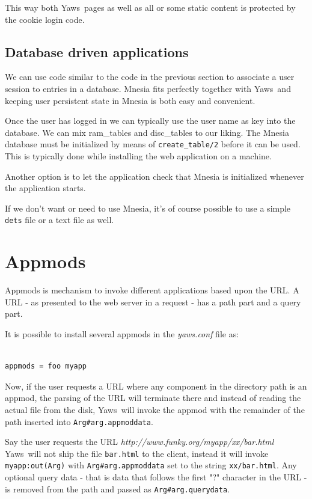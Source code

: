 \documentclass[11pt,oneside,english]{book}
\newcommand{\Yaws}            %
        {{\sc Yaws}}
\begin{document}
This way both \Yaws\  pages as well as all or some static content
is protected by the cookie login code.


\subsection{Database driven applications}

We can use code similar to the code in the previous section to associate
a user session to entries in a database. Mnesia fits perfectly
together with \Yaws\  and keeping user persistent state in Mnesia is
both easy and convenient.

Once the user has logged in we can typically use the user name
as key into the database. We can mix ram\_tables and disc\_tables
to our liking. The Mnesia database must be initialized by means
of \verb+create_table/2+ before it
can be used. This is typically done while installing the
web application on a machine.

Another option is to let the application check that Mnesia
is initialized whenever the application starts.

If we don't want or need to use Mnesia, it's of course possible
to use a simple \verb+dets+ file or a text file as well.

\section{Appmods}

Appmods is mechanism to invoke different applications
based upon the URL. A URL - as presented to the web server in
a request - has a path part and a query part.

It is possible to install several appmods in the \textit{yaws.conf}
file as:
\begin{verbatim}

appmods = foo myapp

\end{verbatim}

Now, if the user requests a URL where any component in the
directory path is an appmod, the parsing of the URL will terminate
there and instead of reading the actual file from the disk, \Yaws\  will
invoke the appmod with the remainder of the path inserted into
\verb+Arg#arg.appmoddata+.

Say the user requests the URL \textit{http://www.funky.org/myapp/xx/bar.html}
\Yaws\  will not ship the file \verb+bar.html+ to the client, instead it
will invoke \verb+myapp:out(Arg)+ with \verb+Arg#arg.appmoddata+
set to the string \verb+xx/bar.html+. Any optional query data - that
is data that follows the first "?" character in the URL -
is removed from the path and passed as \verb+Arg#arg.querydata+.
\end{document}
